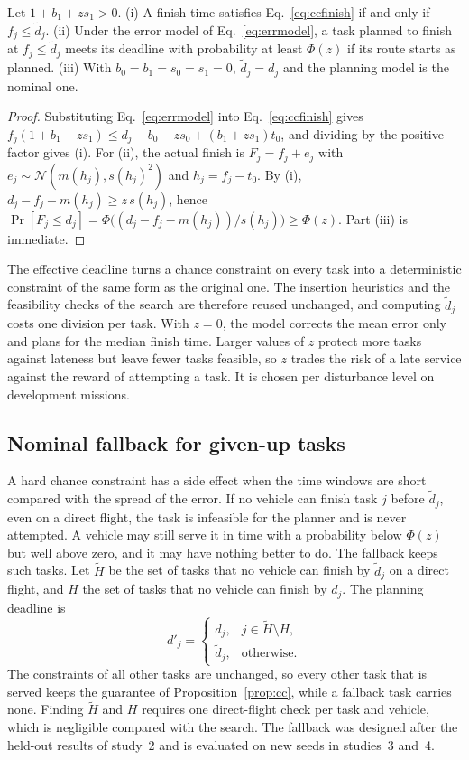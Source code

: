 \begin{prop}\label{prop:cc}
Let $1+b_1+z s_1>0$. (i) A finish time satisfies Eq.~\eqref{eq:ccfinish} if and only if $f_j\le\tilde d_j$. (ii) Under
the error model of Eq.~\eqref{eq:errmodel}, a task planned to finish at $f_j\le\tilde d_j$ meets its deadline with
probability at least $\Phi(z)$ if its route starts as planned. (iii) With $b_0=b_1=s_0=s_1=0$, $\tilde d_j=d_j$ and the
planning model is the nominal one.
\end{prop}
\begin{proof}
Substituting Eq.~\eqref{eq:errmodel} into Eq.~\eqref{eq:ccfinish} gives
$f_j(1+b_1+zs_1)\le d_j-b_0-zs_0+(b_1+zs_1)t_0$, and dividing by the positive factor gives (i). For (ii), the actual
finish is $F_j=f_j+e_j$ with $e_j\sim\mathcal{N}(m(h_j),s(h_j)^2)$ and $h_j=f_j-t_0$. By (i),
$d_j-f_j-m(h_j)\ge z\,s(h_j)$, hence $\Pr[F_j\le d_j]=\Phi\big((d_j-f_j-m(h_j))/s(h_j)\big)\ge\Phi(z)$. Part (iii) is
immediate.
\end{proof}

The effective deadline turns a chance constraint on every task into a deterministic constraint of the same form as the
original one. The insertion heuristics and the feasibility checks of the search are therefore reused unchanged, and
computing $\tilde d_j$ costs one division per task. With $z=0$, the model corrects the mean error only and plans for the
median finish time. Larger values of $z$ protect more tasks against lateness but leave fewer tasks feasible, so $z$
trades the risk of a late service against the reward of attempting a task. It is chosen per disturbance level on
development missions.

\subsection{Nominal fallback for given-up tasks}\label{sec:fallback}
A hard chance constraint has a side effect when the time windows are short compared with the spread of the error. If no
vehicle can finish task $j$ before $\tilde d_j$, even on a direct flight, the task is infeasible for the planner and is
never attempted. A vehicle may still serve it in time with a probability below $\Phi(z)$ but well above zero, and it may
have nothing better to do. The fallback keeps such tasks. Let $\tilde H$ be the set of tasks that no vehicle can finish
by $\tilde d_j$ on a direct flight, and $H$ the set of tasks that no vehicle can finish by $d_j$. The planning deadline is
\begin{equation}\label{eq:fallback}
d'_j=\begin{cases} d_j, & j\in\tilde H\setminus H,\\ \tilde d_j, & \text{otherwise.}\end{cases}
\end{equation}
The constraints of all other tasks are unchanged, so every other task that is served keeps the guarantee of
Proposition~\ref{prop:cc}, while a fallback task carries none. Finding $\tilde H$ and $H$ requires one direct-flight
check per task and vehicle, which is negligible compared with the search. The fallback was designed after the held-out
results of study~2 and is evaluated on new seeds in studies~3 and~4.

